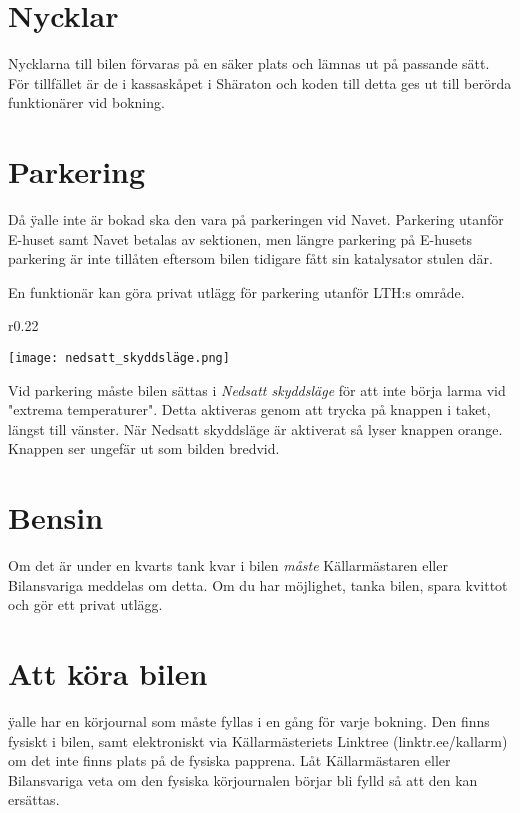 \documentclass{dsekprotokoll}
\begin{document}
\section{Nycklar}
Nycklarna till bilen förvaras på en säker plats och lämnas ut på passande sätt. För tillfället är de i kassaskåpet i Shäraton och koden till detta ges ut till berörda funktionärer vid bokning.

\section{Parkering}

Då \"yalle inte är bokad ska den vara på parkeringen vid Navet. Parkering utanför E-huset samt Navet betalas av sektionen, men längre parkering på E-husets parkering är inte tillåten eftersom bilen tidigare fått sin katalysator stulen där. 

En funktionär kan göra privat utlägg för parkering utanför LTH:s område. 

\begin{wrapfigure}[3]{r}{0.22\textwidth}
    \raggedright
    \vspace{-0.6cm}
    \texttt{[image: nedsatt\_skyddsläge.png]}
\end{wrapfigure}

Vid parkering måste bilen sättas i \emph{Nedsatt skyddsläge} för att inte börja larma vid "extrema temperaturer". Detta aktiveras genom att trycka på knappen i taket, längst till vänster. När Nedsatt skyddsläge är aktiverat så lyser knappen orange. Knappen ser ungefär ut som bilden bredvid.

\section{Bensin} 
Om det är under en kvarts tank kvar i bilen \emph{måste} Källarmästaren eller Bilansvariga meddelas om detta. Om du har möjlighet, tanka bilen, spara kvittot och gör ett privat utlägg.

\section{Att köra bilen} 

\"yalle har en körjournal som måste fyllas i en gång för varje bokning. Den finns fysiskt i bilen, samt elektroniskt via Källarmästeriets Linktree (linktr.ee/kallarm) om det inte finns plats på de fysiska papprena. Låt Källarmästaren eller Bilansvariga veta om den fysiska körjournalen börjar bli fylld så att den kan ersättas. 
\end{document}
